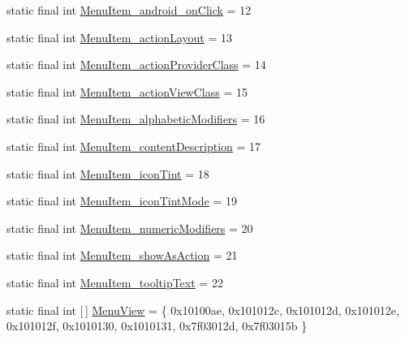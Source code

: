 \begin{DoxyCompactItemize}
\item 
static final int \mbox{\hyperlink{classandroid_1_1support_1_1v7_1_1appcompat_1_1_r_1_1styleable_a365df38239645b048e8c1defd7d07738}{Menu\+Item\+\_\+android\+\_\+on\+Click}} = 12
\item 
static final int \mbox{\hyperlink{classandroid_1_1support_1_1v7_1_1appcompat_1_1_r_1_1styleable_a38b1a51cd51401648f537d796fb89f16}{Menu\+Item\+\_\+action\+Layout}} = 13
\item 
static final int \mbox{\hyperlink{classandroid_1_1support_1_1v7_1_1appcompat_1_1_r_1_1styleable_a2adc6234d0c6d351271313030e3b817d}{Menu\+Item\+\_\+action\+Provider\+Class}} = 14
\item 
static final int \mbox{\hyperlink{classandroid_1_1support_1_1v7_1_1appcompat_1_1_r_1_1styleable_a107c702447c8103b6cf1292a3ed39fa1}{Menu\+Item\+\_\+action\+View\+Class}} = 15
\item 
static final int \mbox{\hyperlink{classandroid_1_1support_1_1v7_1_1appcompat_1_1_r_1_1styleable_aa351c5b8d264b3a5a72207cd1568bba6}{Menu\+Item\+\_\+alphabetic\+Modifiers}} = 16
\item 
static final int \mbox{\hyperlink{classandroid_1_1support_1_1v7_1_1appcompat_1_1_r_1_1styleable_a28b9954ae9cc09471efd1f553606c5e9}{Menu\+Item\+\_\+content\+Description}} = 17
\item 
static final int \mbox{\hyperlink{classandroid_1_1support_1_1v7_1_1appcompat_1_1_r_1_1styleable_a3abd86e50fcdc32ca13340c7033bd4c3}{Menu\+Item\+\_\+icon\+Tint}} = 18
\item 
static final int \mbox{\hyperlink{classandroid_1_1support_1_1v7_1_1appcompat_1_1_r_1_1styleable_a190701212a8e0e202e6fbe0c74fcff21}{Menu\+Item\+\_\+icon\+Tint\+Mode}} = 19
\item 
static final int \mbox{\hyperlink{classandroid_1_1support_1_1v7_1_1appcompat_1_1_r_1_1styleable_a10841856d9d1e9a0f5dded114b5e1bec}{Menu\+Item\+\_\+numeric\+Modifiers}} = 20
\item 
static final int \mbox{\hyperlink{classandroid_1_1support_1_1v7_1_1appcompat_1_1_r_1_1styleable_a90bfa8cb2820ac63ee4de421e3c22817}{Menu\+Item\+\_\+show\+As\+Action}} = 21
\item 
static final int \mbox{\hyperlink{classandroid_1_1support_1_1v7_1_1appcompat_1_1_r_1_1styleable_a248a9115038e8b04bb59751dcc23a2dd}{Menu\+Item\+\_\+tooltip\+Text}} = 22
\item 
static final int \mbox{[}$\,$\mbox{]} \mbox{\hyperlink{classandroid_1_1support_1_1v7_1_1appcompat_1_1_r_1_1styleable_ab45f4f3fe3b636a3730a9fb26bfa1050}{Menu\+View}} = \{ 0x10100ae, 0x101012c, 0x101012d, 0x101012e, 0x101012f, 0x1010130, 0x1010131, 0x7f03012d, 0x7f03015b \}

\end{DoxyCompactItemize}

